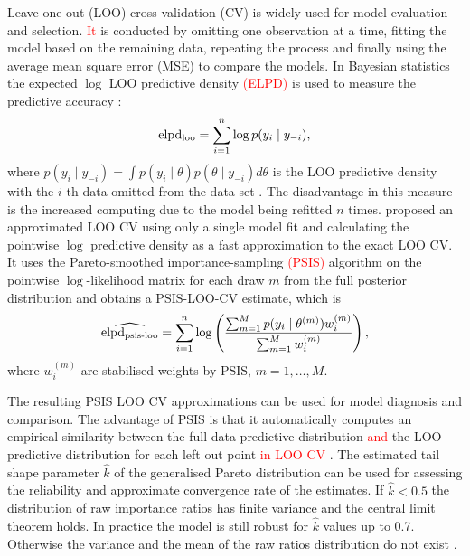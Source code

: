 \documentclass[a4paper]{article}   	%
\newcommand{\elpd}{elpd\textsubscript{loo}}
\newcommand{\psis}{elpd\textsubscript{psis-loo}}
\begin{document}
	
	Leave-one-out (LOO) cross validation (CV) is widely used for model evaluation and selection. \textcolor{red}{It} is conducted by omitting one observation at a time, fitting the model based on the remaining data, repeating the process and finally using the average mean square error (MSE) to compare the models. In Bayesian statistics the expected $\log$ LOO predictive density \textcolor{red}{(ELPD)} is used to measure the predictive accuracy : 
	\begin{equation}\label{eq:elpd}
		\mbox{\elpd} = \sum_{i=1}^{n}\log p(y_i\mid y_{-i}),
	\end{equation}
	where $p(y_i \mid y_{-i}) = \int p(y_i \mid \theta)p(\theta \mid y_{-i})d\theta$ is the LOO predictive density with the $i$-th data omitted from the data set \parencite{Vehtari2017Practical}. The disadvantage in this measure is the increased computing due to the model being refitted $n$ times. \textcite{Burkner2020Efficient} proposed an approximated LOO CV using only a single model fit and calculating the pointwise $\log$ predictive density as a fast approximation to the exact LOO CV. It uses the Pareto-smoothed importance-sampling \textcolor{red}{(PSIS)} \parencite{Vehtari2017Practical} algorithm on the pointwise $\log$-likelihood matrix for each draw $m$ from the full posterior distribution and obtains a PSIS-LOO-CV estimate, which is
	\begin{equation}
		\widehat{\mbox{\psis}} = \sum_{i=1}^n\log\left(  \frac{ \sum_{m=1}^{M} p(y_i\mid \theta^{(m)})w_i^{(m)} }{ \sum_{m=1}^{M}w_i^{(m)} }\right), 
	\end{equation}
	where $w_i^{(m)}$ are stabilised weights by PSIS, $m = 1, \ldots, M$.  
	
	
	
	The resulting PSIS LOO CV approximations can be used for model diagnosis and comparison. The advantage of PSIS is that it automatically computes an empirical similarity between the full data predictive distribution \textcolor{red}{and} the LOO predictive distribution for each left out point \textcolor{red}{in LOO CV} \parencite{gabry2019Visualization}. The estimated tail shape parameter $\hat{k}$ of the generalised Pareto distribution can be used for assessing the reliability and approximate convergence rate of the estimates. If $\hat{k}<0.5$ the distribution of raw importance ratios has finite variance and the central limit theorem holds. In practice the model is still robust for $\hat{k}$ values up to 0.7. Otherwise the variance and the mean of the raw ratios distribution do not exist \parencite{Vehtari2017Practical}. 
	
\end{document}
